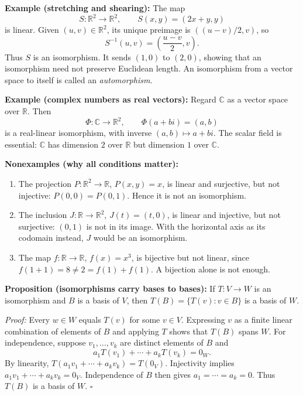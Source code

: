\documentclass[a4paper,11pt,abstract=true]{scrartcl}
\theoremstyle{dotlessP}
\theoremstyle{dotlessS}
\theoremstyle{remark}
\theoremstyle{definition}
\begin{document}
\begin{example_box}
\textbf{Example (stretching and shearing):} The map
\[
S:\mathbb{R}^2\longrightarrow\mathbb{R}^2,
\qquad S(x,y)=(2x+y,y)
\]
is linear. Given $(u,v)\in\mathbb{R}^2$, its unique preimage is
$((u-v)/2,v)$, so
\[
S^{-1}(u,v)=\left(\frac{u-v}{2},v\right).
\]
Thus $S$ is an isomorphism. It sends $(1,0)$ to $(2,0)$, showing that an
isomorphism need not preserve Euclidean length. An isomorphism from a
vector space to itself is called an \emph{automorphism}.
\end{example_box}

\begin{example_box}
\textbf{Example (complex numbers as real vectors):} Regard
$\mathbb{C}$ as a vector space over $\mathbb{R}$. Then
\[
\Phi:\mathbb{C}\longrightarrow\mathbb{R}^2,
\qquad \Phi(a+bi)=(a,b)
\]
is a real-linear isomorphism, with inverse $(a,b)\mapsto a+bi$.
The scalar field is essential: $\mathbb{C}$ has dimension $2$ over
$\mathbb{R}$ but dimension $1$ over $\mathbb{C}$.
\end{example_box}

\begin{example_box}
\textbf{Nonexamples (why all conditions matter):}
\begin{enumerate}
    \item The projection $P:\mathbb{R}^2\longrightarrow\mathbb{R}$,
    $P(x,y)=x$, is linear and surjective, but not injective:
    $P(0,0)=P(0,1)$. Hence it is not an isomorphism.
    \item The inclusion $J:\mathbb{R}\longrightarrow\mathbb{R}^2$,
    $J(t)=(t,0)$, is linear and injective, but not surjective: $(0,1)$
    is not in its image. With the horizontal axis as its codomain instead,
    $J$ would be an isomorphism.
    \item The map $f:\mathbb{R}\longrightarrow\mathbb{R}$,
    $f(x)=x^3$, is bijective but not linear, since
    $f(1+1)=8\neq2=f(1)+f(1)$. A bijection alone is not enough.
\end{enumerate}
\end{example_box}

\begin{claim_box}
\textbf{Proposition (isomorphisms carry bases to bases):} If
$T:V\longrightarrow W$ is an isomorphism and $B$ is a basis of $V$,
then $T(B)=\{T(v):v\in B\}$ is a basis of $W$.

\textit{Proof:} Every $w\in W$ equals $T(v)$ for some $v\in V$.
Expressing $v$ as a finite linear combination of elements of $B$ and
applying $T$ shows that $T(B)$ spans $W$.
For independence, suppose $v_1,\ldots,v_k$ are distinct elements of $B$ and
\[
a_1T(v_1)+\cdots+a_k T(v_k)=0_W.
\]
By linearity, $T(a_1v_1+\cdots+a_k v_k)=T(0_V)$. Injectivity implies
$a_1v_1+\cdots+a_k v_k=0_V$. Independence of $B$ then gives
$a_1=\cdots=a_k=0$. Thus $T(B)$ is a basis of $W$.
\hfill$\square$
\end{claim_box}
\end{document}
